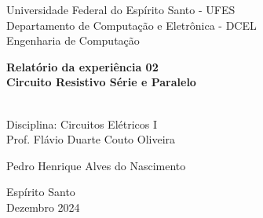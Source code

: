 \begin{titlepage}
    \begin{center}
        \large
        Universidade Federal do Espírito Santo - UFES\\
        Departamento de Computação e Eletrônica - DCEL\\
        Engenharia de Computação
        
        \vfill
        \textbf{
        Relatório da experiência 02\\
        Circuito Resistivo Série e Paralelo\\~\\
        }
        
        Disciplina: Circuitos Elétricos I\\
        Prof. Flávio Duarte Couto Oliveira\\
        
        \vfill
        \begin{flushright}
            Pedro Henrique Alves do Nascimento
        \end{flushright}
        
        \vfill
        Espírito Santo\\
        Dezembro 2024
    \end{center}
    \newpage
\end{titlepage}